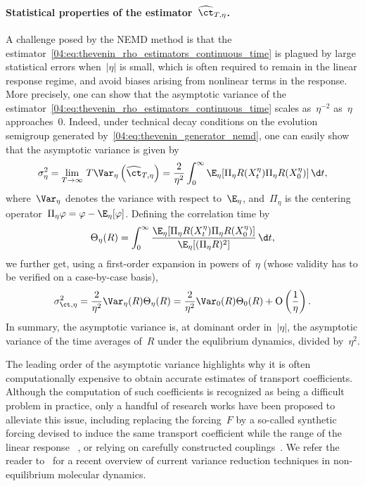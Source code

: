 \paragraph{Statistical properties of the estimator~$\widehat{\ct}_{T,\eta}$.}
A challenge posed by the NEMD method is that the estimator~\eqref{04:eq:thevenin_rho_estimators_continuous_time} is plagued by large statistical errors when~$|\eta|$ is small, which is often required to remain in the linear response regime, and avoid biases arising from nonlinear terms in the response. More precisely, one can show that the asymptotic variance of the estimator~\eqref{04:eq:thevenin_rho_estimators_continuous_time} scales as~$\eta^{-2}$ as~$\eta$ approaches~$0$. Indeed, under technical decay conditions on the evolution semigroup generated by~\eqref{04:eq:thevenin_generator_nemd}, one can easily show that the asymptotic variance is given by
\begin{equation}
\label{04:eq:av_thevenin}
\sigma_{\eta}^2 = \lim_{T\to\infty}\, T\Var_\eta\left(\widehat{\ct}_{T,\eta}\right) =  \frac{2}{\eta^2}\int_0^\infty \E_{\eta}[\Pi_\eta R(X_{t}^\eta)\Pi_\eta R(X_0^\eta)]\,\d t,
\end{equation}
where~$\Var_\eta$ denotes the variance with respect to~$\E_\eta$, and~$\Pi_\eta$ is the centering operator~$\Pi_\eta \varphi = \varphi-\E_\eta[\varphi]$.
Defining the correlation time by
\begin{equation}
\label{04:eq:nemd_correlation_time}
    \Theta_{\eta}(R) = \int_{0}^\infty \frac{\E_\eta[\Pi_\eta R(X_t^\eta)\Pi_\eta R(X_0^\eta)]}{\E_\eta[(\Pi_\eta R)^2]}\,\d t,
\end{equation}
we further get, using a first-order expansion in powers of~$\eta$ (whose validity has to be verified on a case-by-case basis), 
\begin{equation}
    \label{04:eq:nemd_av_asymptotic}
    \sigma_{\ct,\eta}^2=\frac{2}{\eta^2}\Var_\eta(R)\Theta_{\eta}(R)=\frac2{\eta^2}\Var_0(R)\Theta_0(R) +\mathrm{O}\left(\frac1\eta\right).
\end{equation}
In summary, the asymptotic variance is, at dominant order in~$|\eta|$, the asymptotic variance of the time averages of~$R$ under the equlibrium dynamics, divided by~$\eta^2$.

The leading order of the asymptotic variance highlights why it is often computationally expensive to obtain accurate estimates of transport coefficients. Although the computation of such coefficients is recognized as being a difficult problem in practice, only a handful of research works have been proposed to alleviate this issue, including replacing the forcing~$F$ by a so-called synthetic forcing devised to induce the same transport coefficient while the range of the linear response ~\cite{SS23}, or relying on carefully constructed couplings~\cite{DES24}. We refer the reader to~\cite[Section~4]{S24} for a recent overview of current variance reduction techniques in non-equilibrium molecular dynamics.

